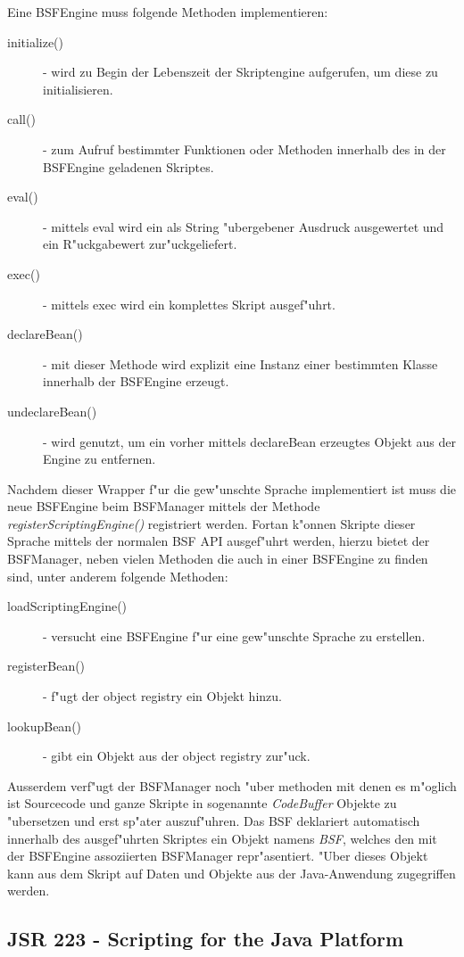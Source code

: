 Eine BSFEngine muss folgende Methoden implementieren:
\begin{description}
    \item[initialize()] - wird zu Begin der Lebenszeit der Skriptengine aufgerufen, um diese zu initialisieren.
    \item[call()] - zum Aufruf bestimmter Funktionen oder Methoden innerhalb des in der BSFEngine geladenen Skriptes.
    \item[eval()] - mittels eval wird ein als String "ubergebener Ausdruck ausgewertet und ein R"uckgabewert zur"uckgeliefert.
    \item[exec()] - mittels exec wird ein komplettes Skript ausgef"uhrt.
    \item[declareBean()] - mit dieser Methode wird explizit eine Instanz einer bestimmten Klasse innerhalb der BSFEngine erzeugt.
    \item[undeclareBean()] - wird genutzt, um ein vorher mittels declareBean erzeugtes Objekt aus der Engine zu entfernen.
\end{description}

Nachdem dieser Wrapper f"ur die gew"unschte Sprache implementiert ist muss die neue BSFEngine beim BSFManager mittels der
Methode \emph{registerScriptingEngine()} registriert werden. Fortan k"onnen Skripte dieser Sprache mittels der normalen
BSF API ausgef"uhrt werden, hierzu bietet der BSFManager, neben vielen Methoden die auch in einer BSFEngine zu finden sind,
unter anderem folgende Methoden:
\begin{description}
    \item[loadScriptingEngine()] - versucht eine BSFEngine f"ur eine gew"unschte Sprache zu erstellen.
    \item[registerBean()] - f"ugt der object registry ein Objekt hinzu.
    \item[lookupBean()] - gibt ein Objekt aus der object registry zur"uck.
\end{description}
Ausserdem verf"ugt der BSFManager noch "uber methoden mit denen es m"oglich ist Sourcecode und ganze Skripte in sogenannte
\emph{CodeBuffer} Objekte zu "ubersetzen und erst sp"ater auszuf"uhren.
Das BSF deklariert automatisch innerhalb des ausgef"uhrten Skriptes ein Objekt namens \emph{BSF}, welches den mit der
BSFEngine assoziierten BSFManager repr"asentiert. "Uber dieses Objekt kann aus dem Skript auf Daten und Objekte aus der
Java-Anwendung zugegriffen werden.

\subsection{JSR 223 - Scripting for the Java Platform}
\label{sec:chap1:ana:jsr}

